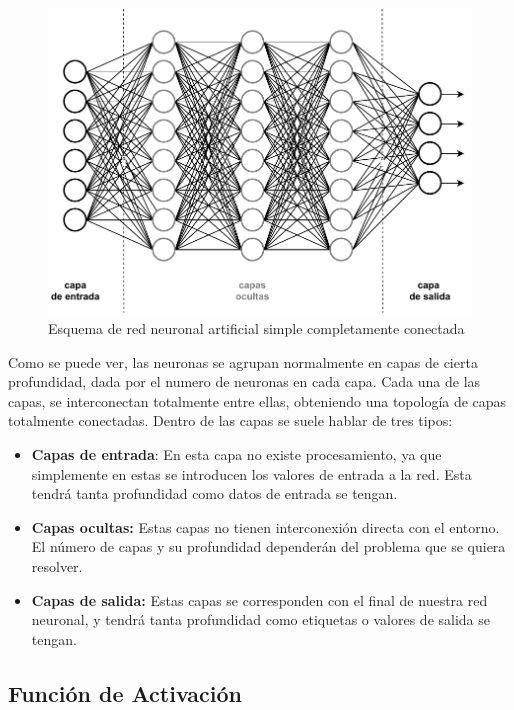 \begin{figure}[h]
    \centering
    \includegraphics[width=1.1\textwidth]{figuras/desarrollo teorico/red_neuronal.pdf}
    \caption{Esquema de red neuronal artificial simple completamente conectada}
    \label{fig:red_neuronal}
\end{figure}

Como se puede ver, las neuronas se agrupan normalmente en capas de cierta profundidad, dada por el numero de neuronas en cada capa. Cada una de las capas, se interconectan totalmente entre ellas, obteniendo una topología de capas totalmente conectadas. Dentro de las capas se suele hablar de tres tipos:

\begin{itemize}
    \item \textbf{Capas de entrada}: En esta capa no existe procesamiento, ya que simplemente en estas se introducen los valores de entrada a la red. Esta tendrá tanta profundidad como datos de entrada se tengan.
    \item \textbf{Capas ocultas:} Estas capas no tienen interconexión directa con el entorno. El número de capas y su profundidad dependerán del problema que se quiera resolver.
    \item \textbf{Capas de salida:} Estas capas se corresponden con el final de nuestra red neuronal, y tendrá tanta profundidad como etiquetas o valores de salida se tengan.
\end{itemize}

\subsection{Función de Activación}

